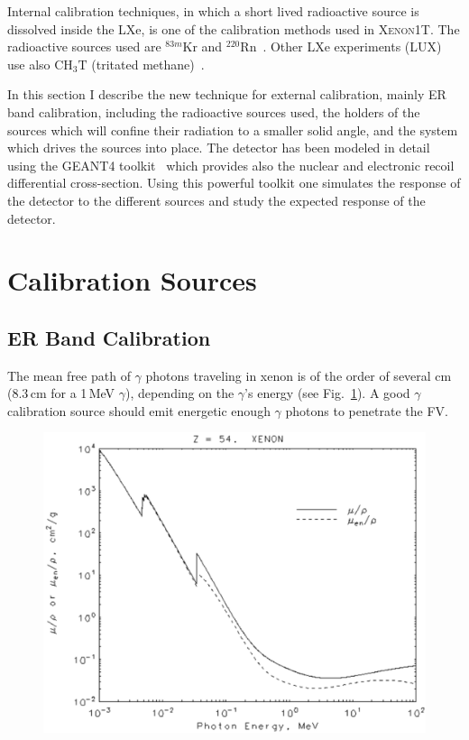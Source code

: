 Internal calibration techniques, in which a short lived radioactive source is dissolved inside the LXe, is one of the calibration methods used in \textsc{Xenon1T}. The radioactive sources used are $^{83m}\mathrm{Kr}$ and $^{220}\mathrm{Rn}$~\cite{Aprile:2016pmc,Aprile:2017aty}. Other LXe experiments (LUX) use also $\mathrm{CH_3T}$ (tritated methane)~\cite{Akerib:2015wdi}.    


In this section I describe the new technique for external calibration, mainly ER band calibration, including the radioactive sources used, the holders of the sources which will confine their radiation to a smaller solid angle, and the system which drives the sources into place. The detector has been modeled in detail using the GEANT4 toolkit~\cite{AGOSTINELLI2003250} which provides also the nuclear and electronic recoil differential cross-section. Using this powerful toolkit one simulates the response of the detector to the different sources and study the expected response of the detector. 



\section{Calibration Sources}
\label{sec:source}
\subsection{ER Band Calibration}
The mean free path of $\gamma$ photons traveling in xenon is of the order of several cm (8.3\,cm for a 1\,MeV $\gamma$), depending on the $\gamma$'s energy (see Fig.~\ref{fig:MFP}). A good $\gamma$ calibration source should emit energetic enough $\gamma$ photons to penetrate the FV. 

\begin{figure}
	\begin{center}
	\includegraphics[width=\textwidth]{figs/NISTAttXenon.png}%
		\label{fig:MFP}
		\end{center}
	
\end{figure} 

